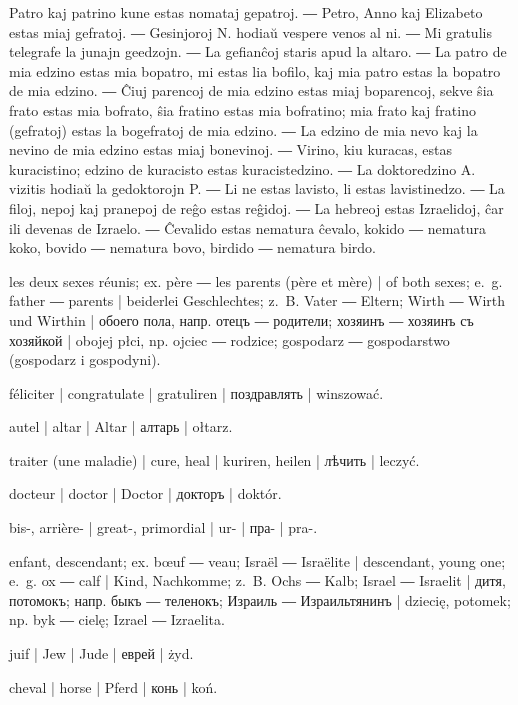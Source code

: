 \newpage %


Patro kaj patrino kune estas nomataj gepatroj. ― Petro, Anno kaj Elizabeto estas miaj gefratoj. ― Gesinjoroj N. hodiaŭ vespere venos al ni. ― Mi gratulis telegrafe la junajn geedzojn. ― La gefianĉoj staris apud la altaro. ― La patro de mia edzino estas mia bopatro, mi estas lia bofilo, kaj mia patro estas la bopatro de mia edzino. ― Ĉiuj parencoj de mia edzino estas miaj boparencoj, sekve ŝia frato estas mia bofrato, ŝia fratino estas mia bofratino; mia frato kaj fratino (gefratoj) estas la bogefratoj de mia edzino. ― La edzino de mia nevo kaj la nevino de mia edzino estas miaj bonevinoj. ― Virino, kiu kuracas, estas kuracistino; edzino de kuracisto estas kuracistedzino. ― La doktoredzino A. vizitis hodiaŭ la gedoktorojn P. ― Li ne estas lavisto, li estas lavistinedzo. ― La filoj, nepoj kaj pranepoj de reĝo estas reĝidoj. ― La hebreoj estas Izraelidoj, ĉar ili devenas de Izraelo. ― Ĉevalido estas nematura ĉevalo, kokido ― nematura koko, bovido ― nematura bovo, birdido ― nematura birdo.

\begin{ekzvocab}{1em}
 les deux sexes réunis; ex.  père ―  les parents (père et mère) | of both sexes; e.~g.  father ―  parents | beiderlei Geschlechtes; z.~B.  Vater ―  Eltern;  Wirth ―  Wirth und Wirthin | обоего пола, напр.  отецъ ―  родители;  хозяинъ ―  хозяинъ съ хозяйкой | obojej płci, np.  ojciec ―  rodzice;  gospodarz ―  gospodarstwo (gospodarz i gospodyni).

 féliciter | congratulate | gratuliren | поздравлять | winszować.

 autel | altar | Altar | алтарь | ołtarz.

 traiter (une maladie) | cure, heal | kuriren, heilen | лѣчить | leczyć.

 docteur | doctor | Doctor | докторъ | doktór.

 bis-, arrière- | great-, primordial | ur- | пра- | pra-.

 enfant, descendant; ex.  bœuf ―  veau;  Israël ―  Israëlite | descendant, young one; e.~g.  ox ―  calf | Kind, Nachkomme; z.~B.  Ochs ―  Kalb;  Israel ―  Israelit | дитя, потомокъ; напр.  быкъ ―  теленокъ;  Израиль ―  Израильтянинъ | dziecię, potomek; np.  byk ―  cielę;  Izrael ―  Izraelita.

 juif | Jew | Jude | еврей | żyd.

 cheval | horse | Pferd | конь | koń.

\end{ekzvocab}


